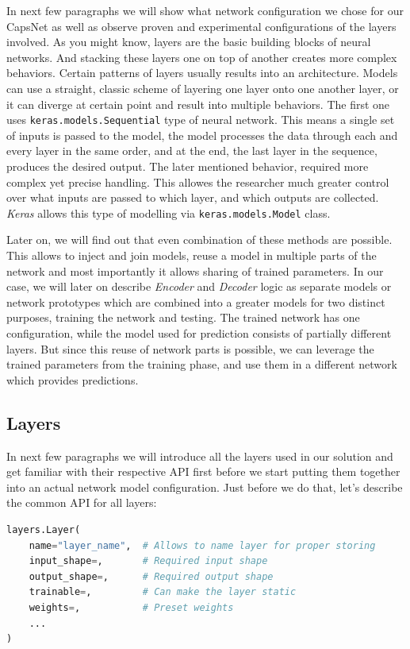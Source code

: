 In next few paragraphs we will show what network configuration we chose for our CapsNet as well as observe proven and experimental configurations of the layers involved. As you might know, layers are the basic building blocks of neural networks. And stacking these layers one on top of another creates more complex behaviors. Certain patterns of layers usually results into an architecture. Models can use a straight, classic scheme of layering one layer onto one another layer, or it can diverge at certain point and result into multiple behaviors. The first one uses \texttt{keras.models.Sequential} type of neural network. This means a single set of inputs is passed to the model, the model processes the data through each and every layer in the same order, and at the end, the last layer in the sequence, produces the desired output. The later mentioned behavior, required more complex yet precise handling. This allowes the researcher much greater control over what inputs are passed to which layer, and which outputs are collected. \textit{Keras} allows this type of modelling via \texttt{keras.models.Model} class.

Later on, we will find out that even combination of these methods are possible. This allows to inject and join models, reuse a model in multiple parts of the network and most importantly it allows sharing of trained parameters. In our case, we will later on describe \textit{Encoder} and \textit{Decoder} logic as separate models or network prototypes which are combined into a greater models for two distinct purposes, training the network and testing. The trained network has one configuration, while the model used for prediction consists of partially different layers. But since this reuse of network parts is possible, we can leverage the trained parameters from the training phase, and use them in a different network which provides predictions.

\subsection{Layers}

In next few paragraphs we will introduce all the layers used in our solution and get familiar with their respective API first before we start putting them together into an actual network model configuration. Just before we do that, let's describe the common API for all layers:

\begin{lstlisting}[language=Python, caption=Common layer API]
layers.Layer(
    name="layer_name",  # Allows to name layer for proper storing
    input_shape=,       # Required input shape
    output_shape=,      # Required output shape
    trainable=,         # Can make the layer static
    weights=,           # Preset weights
    ...
)
\end{lstlisting}

